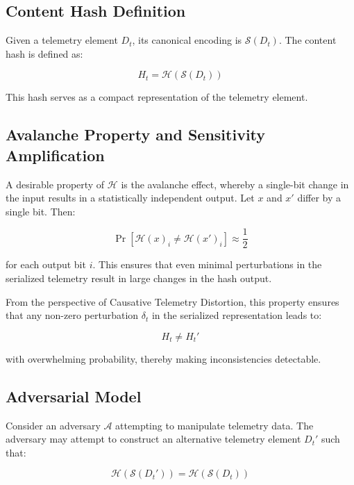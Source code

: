 \subsection{Content Hash Definition}

Given a telemetry element $D_t$, its canonical encoding is $\mathcal{S}(D_t)$. The content hash is defined as:

\begin{equation}
H_t = \mathcal{H}(\mathcal{S}(D_t))
\end{equation}

This hash serves as a compact representation of the telemetry element.

\subsection{Avalanche Property and Sensitivity Amplification}

A desirable property of $\mathcal{H}$ is the avalanche effect, whereby a single-bit change in the input results in a statistically independent output. Let $x$ and $x'$ differ by a single bit. Then:

\begin{equation}
\Pr[\mathcal{H}(x)_i \neq \mathcal{H}(x')_i] \approx \frac{1}{2}
\end{equation}

for each output bit $i$. This ensures that even minimal perturbations in the serialized telemetry result in large changes in the hash output.

From the perspective of Causative Telemetry Distortion, this property ensures that any non-zero perturbation $\delta_t$ in the serialized representation leads to:

\begin{equation}
H_t \neq H_t'
\end{equation}

with overwhelming probability, thereby making inconsistencies detectable.

\subsection{Adversarial Model}

Consider an adversary $\mathcal{A}$ attempting to manipulate telemetry data. The adversary may attempt to construct an alternative telemetry element $D_t'$ such that:

\begin{equation}
\mathcal{H}(\mathcal{S}(D_t')) = \mathcal{H}(\mathcal{S}(D_t))
\end{equation}

